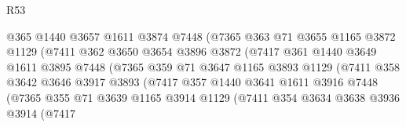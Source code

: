\begin{lexlean}{R53}
\begin{coremodule}
                              @365
                              @1440
                              @3657
                              @1611
                              @3874
                              @7448
                              (@7365
                                @363
                                @71
                                @3655
                                @1165
                                @3872
                                @1129
                                (@7411
                                  @362
                                  @3650
                                  @3654
                                  @3896
                                  @3872
                                  (@7417
                                    @361
                                    @1440
                                    @3649
                                    @1611
                                    @3895
                                    @7448
                                    (@7365
                                      @359
                                      @71
                                      @3647
                                      @1165
                                      @3893
                                      @1129
                                      (@7411
                                        @358
                                        @3642
                                        @3646
                                        @3917
                                        @3893
                                        (@7417
                                          @357
                                          @1440
                                          @3641
                                          @1611
                                          @3916
                                          @7448
                                          (@7365
                                            @355
                                            @71
                                            @3639
                                            @1165
                                            @3914
                                            @1129
                                            (@7411
                                              @354
                                              @3634
                                              @3638
                                              @3936
                                              @3914
                                              (@7417

\end{coremodule}
\end{lexlean}

